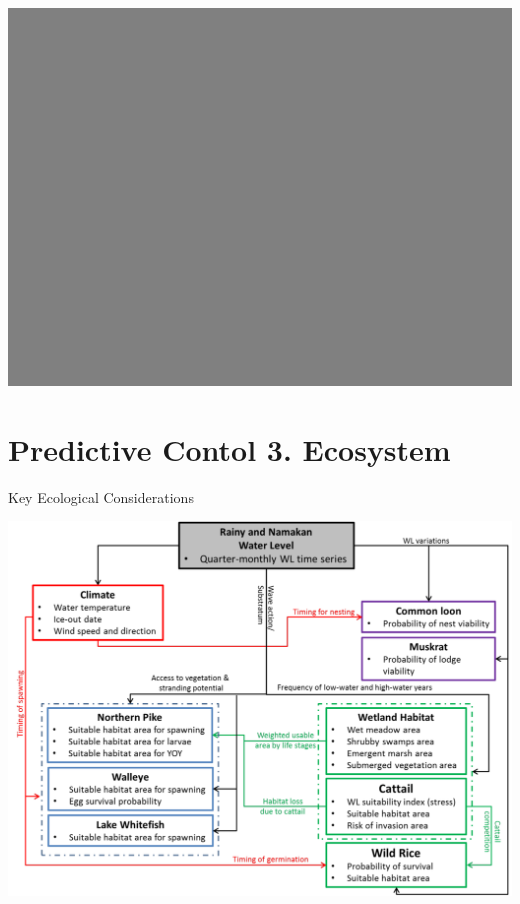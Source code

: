 \documentclass[compress,english]{beamer}
\begin{document}
{\usebackgroundtemplate%
	{\includegraphics[width=\paperwidth]{background_grey.png}}
\section{Predictive Contol 3. Ecosystem}
}

\begin{frame}{Key Ecological Considerations}

\begin{center}
\includegraphics[width=0.8\paperwidth]{MorinEcology.png}
\end{center}

\end{frame}
\end{document}
